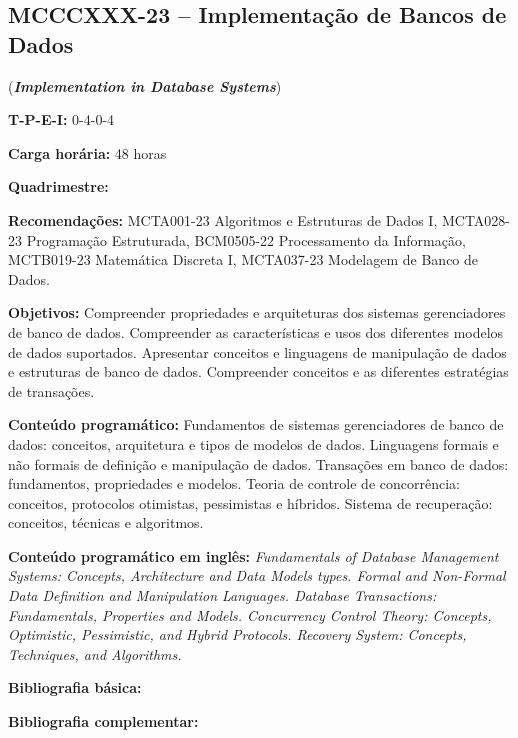 \documentclass[class=article, crop=false]{standalone}
\begin{document}
\subsection*{MCCCXXX-23 -- Implementação de Bancos de Dados}
\label{disc:ia}

(\textbf{\textit{Implementation in Database Systems}})

\begin{center}
    \begin{minipage}{0.85\textwidth}
        \textbf{T-P-E-I:} 0-4-0-4
        
        \textbf{Carga horária:} 48 horas
        
        \textbf{Quadrimestre:}
        
        \textbf{Recomendações:}
        MCTA001-23 Algoritmos e Estruturas de Dados I,
        MCTA028-23 Programação Estruturada,
        BCM0505-22 Processamento da Informação,
        MCTB019-23 Matemática Discreta I,
        MCTA037-23 Modelagem de  Banco de Dados.
    \end{minipage}
\end{center}

\textbf{Objetivos:}
Compreender propriedades e arquiteturas dos sistemas gerenciadores de banco de
dados. 
Compreender as características e usos dos diferentes modelos de dados
suportados. 
Apresentar conceitos e linguagens de manipulação de dados e estruturas de banco
de dados. 
Compreender conceitos e as diferentes estratégias de transações. 

\textbf{Conteúdo programático:}
Fundamentos de sistemas gerenciadores de banco de dados: conceitos, arquitetura e tipos de modelos de dados.  Linguagens formais e não formais de definição e manipulação de dados. Transações em banco de dados: fundamentos, propriedades e modelos.  Teoria de controle de concorrência: conceitos, protocolos otimistas, pessimistas e híbridos.  Sistema de recuperação: conceitos, técnicas e algoritmos.

\textbf{Conteúdo programático em inglês:}
\textit{Fundamentals of Database Management Systems: Concepts, Architecture and Data Models types.  Formal and Non-Formal Data Definition and Manipulation Languages.  Database Transactions: Fundamentals, Properties and Models.  Concurrency Control Theory: Concepts, Optimistic, Pessimistic, and Hybrid Protocols.  Recovery System: Concepts, Techniques, and Algorithms.}

\newrefsection
\textbf{Bibliografia básica:}
\nocite{2005-elmasri-navathe,2015-date,SILBERSCHATZ-2003}
\printbibliography

\newrefsection
\textbf{Bibliografia complementar:}
\nocite{date-2009,sippu-2006,weikum-2001,wiese-2015,bernstein-2009}
\printbibliography
\end{document}
